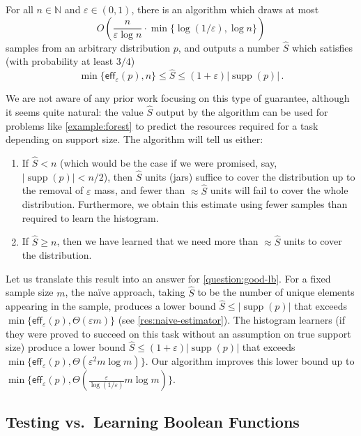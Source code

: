 \documentclass{theoretics}
\DeclareMathOperator{\supp}{supp}   %
\newcommand{\bN}{\ensuremath{\mathbb{N}}}
\newcommand{\eff}{\mathsf{eff}}
\renewcommand{\epsilon}{\varepsilon}
\begin{document}
\begin{corollary}
\label{res:intro-good-lb}
For all $n \in \bN$ and $\epsilon \in (0,1)$, there is an algorithm which draws at most
\[
  O\left(\frac{n}{\epsilon \log n} \cdot \min\{ \log(1/\epsilon), \log n \} \right)
\]
samples from an arbitrary distribution $p$, and outputs a number $\widehat S$ which satisfies (with
probability at least $3/4$)
\[
  \min\{ \eff_\epsilon(p), n \} \leq \widehat S \leq (1+\epsilon) |\supp(p)| \,.
\]
\end{corollary}
\noindent
We are not aware of any prior work focusing on this type of guarantee, although it seems
quite natural: the value $\widehat S$ output by the algorithm can be used for problems like
\cref{example:forest} to predict the resources required for a task depending on support size. The
algorithm will tell us either:
\begin{enumerate}[itemsep=0pt]
\item If $\widehat S < n$ (which would be the case if we were promised, say, $|\supp(p)| < n/2$),
then $\widehat S$ units (jars) suffice to cover the distribution up to the removal of $\epsilon$
mass, and fewer than $\approx \widehat S$ units will fail to cover the whole distribution.
Furthermore, we obtain this estimate using fewer samples than required to learn the histogram.
\item If $\widehat S \geq n$, then we have learned that we need more than $\approx \widehat S$ units
to cover the distribution.
\end{enumerate}
Let us translate this result into an answer for \cref{question:good-lb}. For a fixed sample size
$m$, the na\"ive approach, taking $\widehat S$ to be the number of unique elements appearing in the
sample, produces a lower bound $\widehat S \leq |\supp(p)|$ that exceeds $\min\{\eff_\epsilon(p),
\Theta(\epsilon m)\}$ (see \cref{res:naive-estimator}). The histogram learners (if they were proved
to succeed on this task without an assumption on true support size) produce a lower bound $\widehat
S \leq (1+\epsilon)|\supp(p)|$ that exceeds $\min\{\eff_\epsilon(p), \Theta(\epsilon^2 m \log m)\}$.
Our algorithm improves this lower bound up to $\min\{\eff_\epsilon(p),
\Theta(\tfrac{\epsilon}{\log(1/\epsilon)} m \log m)\}$.  

\subsection{Testing \texorpdfstring{vs.~Learning Boolean Functions}{vs. Learning Boolean Functions}}
\end{document}
